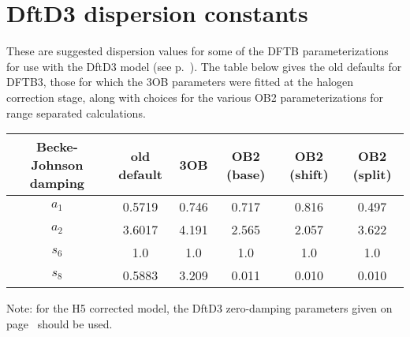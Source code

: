 
\chapter{DftD3 dispersion constants}
\label{app:dftd3const}

These are suggested dispersion values for some of the DFTB parameterizations for
use with the DftD3 model (see p.~). The table below gives
the old defaults for DFTB3, those for which the 3OB parameters were fitted at
the halogen correction stage, along with choices for the various OB2
parameterizations for range separated calculations.

\begin{tabular}{|c|ccccc|}
  \hline Becke-Johnson damping
  & old default & 3OB & OB2 (base) & OB2 (shift) & OB2 (split)\\
  \hline
  $a_1$ & 0.5719 & 0.746 & 0.717 & 0.816 & 0.497\\
  $a_2$ & 3.6017 & 4.191 & 2.565 & 2.057 & 3.622\\
  $s_6$ & 1.0    & 1.0   & 1.0   & 1.0   & 1.0\\
  $s_8$ & 0.5883 & 3.209 & 0.011 & 0.010 & 0.010\\
  \hline
\end{tabular}

Note: for the H5 corrected model, the DftD3 zero-damping parameters given on
page~ should be used. 
